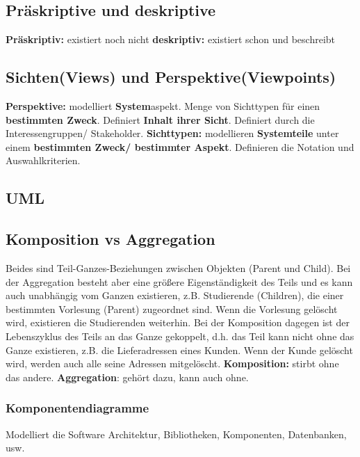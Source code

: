 \documentclass{book}
\begin{document}
    \subsection{Präskriptive und deskriptive}
    \textbf{Präskriptiv:} existiert noch nicht
    \newline
    \textbf{deskriptiv:} existiert schon und beschreibt
    \subsection{Sichten(Views) und Perspektive(Viewpoints)}
    \textbf{Perspektive:} modelliert \textbf{System}aspekt. Menge von Sichttypen für einen \textbf{bestimmten Zweck}. Definiert \textbf{Inhalt ihrer Sicht}.
    \newline Definiert durch die Interessengruppen/ Stakeholder.
    \newline
    \newline
    \textbf{Sichttypen:} modellieren \textbf{Systemteile} unter einem \textbf{bestimmten Zweck/ bestimmter Aspekt}. Definieren die Notation und Auswahlkriterien.


    \subsection{UML}
    \subsection{\textbf{Komposition vs Aggregation}}
    Beides sind Teil-Ganzes-Beziehungen zwischen Objekten (Parent und
    Child). Bei der Aggregation besteht aber eine größere Eigenständigkeit des Teils
    und es kann auch unabhängig vom Ganzen existieren, z.B. Studierende (Children), die einer bestimmten Vorlesung (Parent) zugeordnet sind. Wenn die Vorlesung gelöscht wird, existieren die Studierenden weiterhin. Bei der Komposition
    dagegen ist der Lebenszyklus des Teils an das Ganze gekoppelt, d.h. das Teil
    kann nicht ohne das Ganze existieren, z.B. die Lieferadressen eines Kunden.
    Wenn der Kunde gelöscht wird, werden auch alle seine Adressen mitgelöscht.
    \newline
    \textbf{Komposition:} stirbt ohne das andere. \newline
    \textbf{Aggregation}: gehört dazu, kann auch  ohne.
    \subsubsection{Komponentendiagramme}
    Modelliert die Software Architektur, Bibliotheken, Komponenten, Datenbanken, usw.
\end{document}
